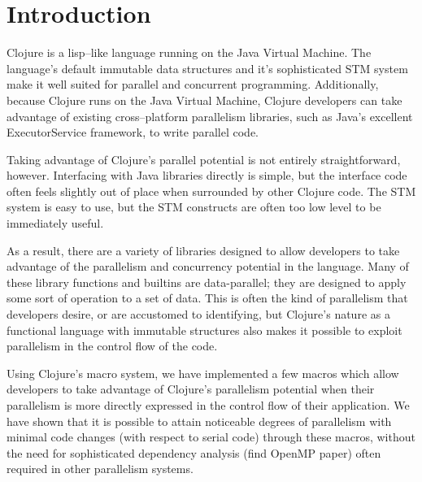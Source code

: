 \documentclass{article}
\begin{document}
\section{Introduction}
Clojure is a lisp--like language running on the Java Virtual Machine.
The language's default immutable data structures and it's sophisticated STM system make it well suited for parallel and concurrent programming.
Additionally, because Clojure runs on the Java Virtual Machine, Clojure developers can take advantage of existing cross--platform parallelism libraries, such as Java's excellent ExecutorService framework, to write parallel code.

Taking advantage of Clojure's parallel potential is not entirely straightforward, however.
Interfacing with Java libraries directly is simple, but the interface code often feels slightly out of place when surrounded by other Clojure code.
The STM system is easy to use, but the STM constructs are often too low level to be immediately useful.

As a result, there are a variety of libraries designed to allow developers to take advantage of the parallelism and concurrency potential in the language.
Many of these library functions and builtins are data-parallel; they are designed to apply some sort of operation to a set of data.
This is often the kind of parallelism that developers desire, or are accustomed to identifying, but Clojure's nature as a functional language with immutable structures also makes it possible to exploit parallelism in the control flow of the code.

Using Clojure's macro system, we have implemented a few macros which allow developers to take advantage of Clojure's parallelism potential when their parallelism is more directly expressed in the control flow of their application.
We have shown that it is possible to attain noticeable degrees of parallelism with minimal code changes (with respect to serial code) through these macros, without the need for sophisticated dependency analysis (find OpenMP paper) often required in other parallelism systems.
\end{document}
